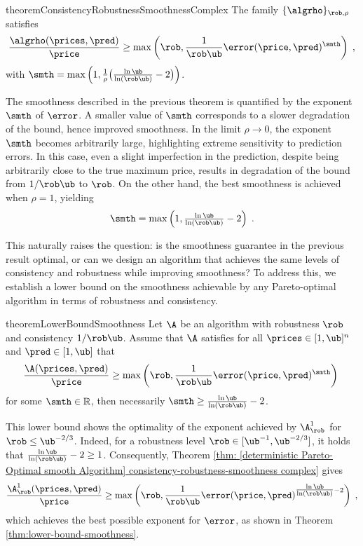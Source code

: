 \begin{restatable}{theorem}{ConsistencyRobustnessSmoothnessComplex}\label{thm: [deterministic Pareto-Optimal smooth Algorithm] consistency-robustness-smoothness complex}
The family $\{\algrho\}_{\rob, \rho}$ satisfies
\begin{equation}\label{eq: [deterministic Pareto-Optimal smooth Algorithm/ THM consistency-robustness-smoothness complex] PR bound}
\frac{\algrho(\prices, \pred)}{\price} \geq 
\max\left(
\rob, \frac{1}{\rob \ub} \error(\price,\pred)^{\smth}
\right)\;,
\end{equation}
with $\smth = \max\left(1, \frac{1}{\rho}\big(\tfrac{\ln \ub}{ \ln (\rob \ub)}-2\big)\right)$.
\end{restatable}
The smoothness described in the previous theorem is quantified by the exponent $\smth$ of $\error$. A smaller value of $\smth$ corresponds to a slower degradation of the bound, hence improved smoothness. In the limit $\rho \to 0$, the exponent $\smth$ becomes arbitrarily large, highlighting extreme sensitivity to prediction errors. In this case, even a slight imperfection in the prediction, despite being arbitrarily close to the true maximum price, results in degradation of the bound from $1/\rob \ub$ to $\rob$. On the other hand, the best smoothness is achieved when $\rho = 1$, yielding 
\[
\smth = \max\left(1, \tfrac{\ln \ub}{ \ln (\rob \ub)} - 2\right)\;.
\]

This naturally raises the question: is the smoothness guarantee in the previous result optimal, or can we design an algorithm that achieves the same levels of consistency and robustness while improving smoothness? To address this, we establish a lower bound on the smoothness achievable by any Pareto-optimal algorithm in terms of robustness and consistency.

\begin{restatable}{theorem}{LowerBoundSmoothness}\label{thm:lower-bound-smoothness}
Let $\A$ be an algorithm with robustness $\rob$ and consistency $1/\rob \ub$. Assume that $\A$ satisfies for all $\prices \in [1,\ub]^n$ and $\pred \in [1,\ub]$ that
\begin{equation}
\frac{\A(\prices, \pred)}{\price} \geq 
\max\left(
\rob, \frac{1}{\rob \ub} \error(\price,\pred)^{\smth}
\right)\;
\end{equation}
for some $\smth \in \mathbb{R}$, then necessarily $\smth \geq \tfrac{\ln \ub}{ \ln (\rob \ub)}-2$.
\end{restatable}

This lower bound shows the optimality of the exponent achieved by $\A^1_\rob$ for $\rob \leq \ub^{-2/3}$. Indeed, for a robustness level $\rob \in [\ub^{-1}, \ub^{-2/3}]$, it holds that $\tfrac{\ln \ub}{\ln (\rob \ub)} - 2 \geq 1$. Consequently, Theorem \ref{thm: [deterministic Pareto-Optimal smooth Algorithm] consistency-robustness-smoothness complex} gives
\[
\frac{\A^1_\rob(\prices, \pred)}{\price} \geq 
\max\left(
\rob, \frac{1}{\rob \ub} \error(\price,\pred)^{\tfrac{\ln \ub}{ \ln (\rob \ub)}-2}
\right)\;,
\]
which achieves the best possible exponent for $\error$, as shown in Theorem \ref{thm:lower-bound-smoothness}. 

